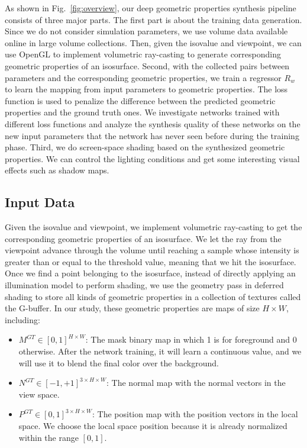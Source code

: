 \documentclass[journal]{vgtc}                %
\begin{document}
As shown in Fig.~\ref{fig:overview}, our deep geometric properties synthesis pipeline consists of three major parts. The first part is about the training data generation. Since we do not consider simulation parameters, we use volume data available online in large volume collections. Then, given the isovalue and viewpoint, we can use OpenGL \cite{woo1999opengl} to implement volumetric ray-casting to generate corresponding geometric properties of an isosurface. Second, with the collected pairs between parameters and the corresponding geometric properties, we train a regressor $R_w$ to learn the mapping from input parameters to geometric properties. The loss function is used to penalize the difference between the predicted geometric properties and the ground truth ones. We investigate networks trained with different loss functions and analyze the synthesis quality of these networks on the new input parameters that the network has never seen before during the training phase. Third, we do screen-space shading based on the synthesized geometric properties. We can control the lighting conditions and get some interesting visual effects such as shadow maps.

\subsection{Input Data}
Given the isovalue and viewpoint, we implement volumetric ray-casting to get the corresponding geometric properties of an isosurface. We let the ray from the viewpoint advance through the volume until reaching a sample whose intensity is greater than or equal to the threshold value, meaning that we hit the isosurface. Once we find a point belonging to the isosurface, instead of directly applying an illumination model to perform shading, we use the geometry pass in deferred shading \cite{deering1988triangle} to store all kinds of geometric properties in a collection of textures called the G-buffer. In our study, these geometric properties are maps of size $ H \times W $, including:

\begin{itemize}
\item $M^{GT} \in [0, 1] ^ {H \times W}$: The mask binary map in which 1 is for foreground and 0 otherwise. After the network training, it will learn a continuous value, and we will use it to blend the final color over the background.  

\item $N^{GT} \in [-1, +1] ^ {3 \times H \times W}$: The normal map with the normal vectors in the view space.

\item $P^{GT} \in [0, 1] ^ {3 \times H \times W}$: The position map with the position vectors in the local space. We choose the local space position because it is already normalized within the range $[0, 1]$.

\end{itemize}
\end{document}
